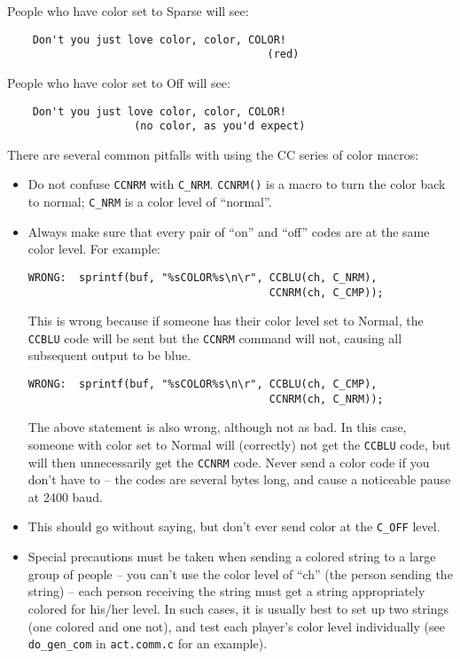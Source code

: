 \documentclass[11pt]{article}
\begin{document}
People who have color set to Sparse will see:
\begin{verbatim}
    Don't you just love color, color, COLOR!
                                         (red)
\end{verbatim}
People who have color set to Off will see:
\begin{verbatim}
    Don't you just love color, color, COLOR!
                    (no color, as you'd expect)
\end{verbatim}
There are several common pitfalls with using the CC series of color macros:
\begin{itemize}
\item Do not confuse \texttt{CCNRM} with \texttt{C\_NRM}.  \texttt{CCNRM()} is a macro to turn the color back to normal; \texttt{C\_NRM} is a color level of ``normal''.
\item Always make sure that every pair of ``on'' and ``off'' codes are at the same color level.  For example:
\begin{verbatim}
WRONG:  sprintf(buf, "%sCOLOR%s\n\r", CCBLU(ch, C_NRM),
                                      CCNRM(ch, C_CMP));
\end{verbatim}
\par
This is wrong because if someone has their color level set to Normal, the \texttt{CCBLU} code will be sent but the \texttt{CCNRM} command will not, causing all subsequent output to be blue.
\begin{verbatim}
WRONG:  sprintf(buf, "%sCOLOR%s\n\r", CCBLU(ch, C_CMP),
                                      CCNRM(ch, C_NRM));
\end{verbatim}
The above statement is also wrong, although not as bad.  In this case, someone with color set to Normal will (correctly) not get the \texttt{CCBLU} code, but will then unnecessarily get the \texttt{CCNRM} code.  Never send a color code if you don't have to -- the codes are several bytes long, and cause a noticeable pause at 2400 baud.
\par
\item This should go without saying, but don't ever send color at the \texttt{C\_OFF} level.
\item Special precautions must be taken when sending a colored string to a large group of people -- you can't use the color level of ``ch'' (the person sending the string) -- each person receiving the string must get a string appropriately colored for his/her level.  In such cases, it is usually best to set up two strings (one colored and one not), and test each player's color level individually (see \texttt{do\_gen\_com} in \texttt{act.comm.c} for an example).
\end{itemize}
\end{document}
